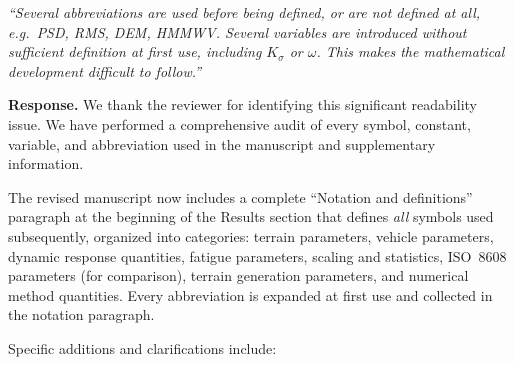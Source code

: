 \documentclass[11pt]{article}
\newcommand{\revquote}[1]{\medskip\noindent\textit{``#1''}\medskip}
\begin{document}
\revquote{Several abbreviations are used before being defined, or are not defined at all, e.g.\ PSD, RMS, DEM, HMMWV. Several variables are introduced without sufficient definition at first use, including $K_\sigma$ or $\omega$. This makes the mathematical development difficult to follow.}

\noindent\textbf{Response.} We thank the reviewer for identifying this significant readability issue. We have performed a comprehensive audit of every symbol, constant, variable, and abbreviation used in the manuscript and supplementary information.

The revised manuscript now includes a complete ``Notation and definitions'' paragraph at the beginning of the Results section that defines \emph{all} symbols used subsequently, organized into categories: terrain parameters, vehicle parameters, dynamic response quantities, fatigue parameters, scaling and statistics, ISO~8608 parameters (for comparison), terrain generation parameters, and numerical method quantities. Every abbreviation is expanded at first use and collected in the notation paragraph.

Specific additions and clarifications include:
\end{document}
